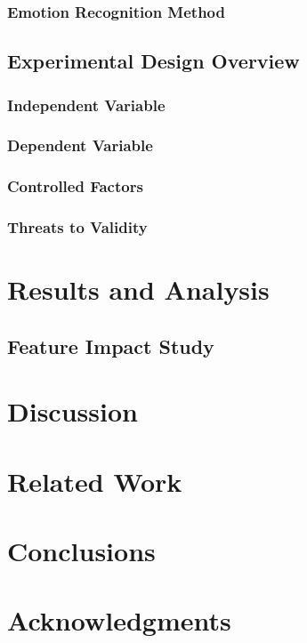 \documentclass{sig-alternate}
\begin{document}
\subsubsection{Emotion Recognition Method}
	
\subsection{Experimental Design Overview}
\subsubsection{Independent Variable}
\subsubsection{Dependent Variable }
\subsubsection{Controlled Factors}
\subsubsection{Threats to Validity}	

\section{Results and Analysis}

\subsection{Feature Impact Study}
\subsection{ }

\section{Discussion}

\section{Related Work}

\section{Conclusions}

\section{Acknowledgments}

%

%
%
\end{document}
